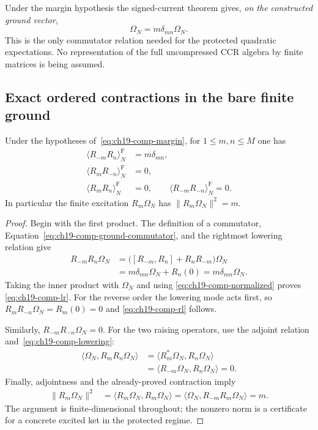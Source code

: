 Under the margin hypothesis the signed-current theorem gives, \emph{on
the constructed ground vector},
\begin{equation}
 [R_{-m},R_n]\Omega_N=m\delta_{mn}\Omega_N.
 \label{eq:ch19-comp-ground-commutator}
\end{equation}
This is the only commutator relation needed for the protected quadratic
expectations.  No representation of the full uncompressed CCR algebra by
finite matrices is being assumed.

\subsection{Exact ordered contractions in the bare finite ground}

\begin{proposition}
\label{prop:ch19-comp-ground-contractions}
Under the hypotheses of~\eqref{eq:ch19-comp-margin}, for
$1\leq m,n\leq M$ one has
\begin{align}
 \langle R_{-m}R_n\rangle_N^{\mathrm F}
     &=m\delta_{mn},
 \label{eq:ch19-comp-lr}\\
 \langle R_mR_{-n}\rangle_N^{\mathrm F}
     &=0,
 \label{eq:ch19-comp-rl}\\
 \langle R_mR_n\rangle_N^{\mathrm F}
     &=0,\qquad
 \langle R_{-m}R_{-n}\rangle_N^{\mathrm F}=0.
 \label{eq:ch19-comp-same-sign}
\end{align}
In particular the finite excitation $R_m\Omega_N$ has
$\|R_m\Omega_N\|^2=m$.
\end{proposition}

\begin{proof}
Begin with the first product.  The definition of a commutator,
Equation~\eqref{eq:ch19-comp-ground-commutator}, and the rightmost
lowering relation give
\begin{align*}
 R_{-m}R_n\Omega_N
 &=\bigl([R_{-m},R_n]+R_nR_{-m}\bigr)\Omega_N\\
 &=m\delta_{mn}\Omega_N+R_n(0)
 =m\delta_{mn}\Omega_N.
\end{align*}
Taking the inner product with $\Omega_N$ and using
\eqref{eq:ch19-comp-normalized} proves
\eqref{eq:ch19-comp-lr}.  For the reverse order the lowering mode acts
first, so
$R_mR_{-n}\Omega_N=R_m(0)=0$ and
\eqref{eq:ch19-comp-rl} follows.

Similarly, $R_{-m}R_{-n}\Omega_N=0$.  For the two raising
operators, use the adjoint relation and~\eqref{eq:ch19-comp-lowering}:
\begin{align*}
 \langle\Omega_N,R_mR_n\Omega_N\rangle
 &=\langle R_m^*\Omega_N,R_n\Omega_N\rangle\\
 &=\langle R_{-m}\Omega_N,R_n\Omega_N\rangle=0.
\end{align*}
Finally, adjointness and the already-proved contraction imply
\begin{align*}
 \|R_m\Omega_N\|^2
 &=\langle R_m\Omega_N,R_m\Omega_N\rangle
 =\langle\Omega_N,R_{-m}R_m\Omega_N\rangle=m.
\end{align*}
The argument is finite-dimensional throughout; the nonzero norm is a
certificate for a concrete excited ket in the protected regime.
\end{proof}

